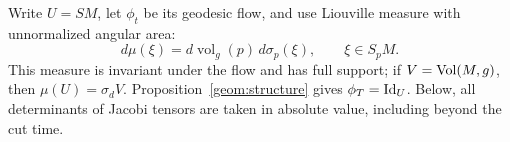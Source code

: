 Write $U=SM$, let $\phi_t$ be its geodesic flow, and use Liouville
measure with unnormalized angular area:
\begin{equation}\label{geom:liouville}
 d\mu(\xi)=d\operatorname{vol}_g(p)\,d\sigma_p(\xi),
 \qquad \xi\in S_pM.
\end{equation}
This measure is invariant under the flow and has full support;
if $V=\operatorname{Vol}(M,g)$, then $\mu(U)=\sigma_d V$.
Proposition~\ref{geom:structure} gives $\phi_T=\mathrm{Id}_U$.
Below, all determinants of Jacobi tensors are taken in absolute
value, including beyond the cut time.
